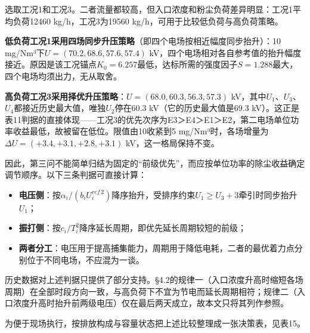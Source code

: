 \documentclass[UTF8,zihao=5,a4paper]{ctexart}
\begin{document}
选取工况1和工况3。二者流量都较高，但入口浓度和粉尘负荷差异明显：工况1平均负荷12460 kg/h，工况3为19560 kg/h，可用于比较低负荷与高负荷策略。

\textbf{低负荷工况1采用四场同步升压策略}（即四个电场按相近幅度同步抬升）：10 mg/Nm³下$U=(70.2,68.6,57.6,57.4)$ kV，四个电场相对各自参考值的抬升幅度接近。原因是该工况锚点$K_0=6.257$最低，达标所需的强度因子$S=1.288$最大，四个电场均须出力，无从取舍。

\textbf{高负荷工况3采用择优升压策略}：$U=(68.0,60.3,56.3,57.3)$ kV，其中$U_1$、$U_3$、$U_4$都接近历史最大值，唯独$U_2$停在60.3 kV（它的历史最大值是69.3 kV）。这正是表11判据的直接体现——工况3的优先次序为E3＞E4＞E1＞E2，第二电场单位功率收益最低，故被留在低位。限值由10收紧到5 mg/Nm³时，各场增量为$\Delta U=(+3.4,+3.1,+2.8,+3.1)$ kV，这一格局保持不变。

因此，第三问不能简单归结为固定的“前级优先”，而应按单位功率的除尘收益确定调节顺序。以下三条判据可直接计算：

\begin{itemize}[itemsep=1pt,topsep=3pt]
\item \textbf{电压侧}：按$\alpha_i/(b_iU^{ref\,2}_i)$降序抬升，受排序约束$U_1\ge U_3+3$牵引时同步抬升$U_1$；
\item \textbf{振打侧}：按$c_i/T_i^2$降序延长周期，即优先延长周期较短的前级；
\item \textbf{两者分工}：电压用于提高捕集能力，周期用于降低电耗，二者的最优着力点分别位于不同电场，不应混为一谈。
\end{itemize}

历史数据对上述判据只提供了部分支持。§4.2的规律一（入口浓度升高时缩短各场周期）在全部时段方向一致，与高负荷下不宜为节电而延长周期相符；规律二（入口浓度升高时抬升前两级电压）仅在最后两天成立，故本文只将其列作参照。

为便于现场执行，按排放构成与容量状态把上述比较整理成一张决策表，见表15。
\end{document}
